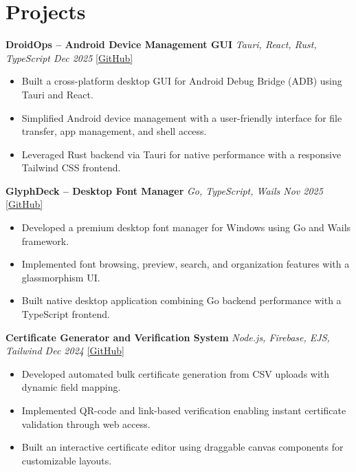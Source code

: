 \documentclass[a4paper,10pt]{article}
\begin{document}
\section*{Projects}

\textbf{DroidOps -- Android Device Management GUI} \hfill \textit{Tauri, React, Rust, TypeScript \quad Dec 2025} \quad \href{https://github.com/your-github/droidops}{[GitHub]}
\begin{itemize}
\item Built a cross-platform desktop GUI for Android Debug Bridge (ADB) using Tauri and React.
\item Simplified Android device management with a user-friendly interface for file transfer, app management, and shell access.
\item Leveraged Rust backend via Tauri for native performance with a responsive Tailwind CSS frontend.
\end{itemize}

\vspace{4pt}

\textbf{GlyphDeck -- Desktop Font Manager} \hfill \textit{Go, TypeScript, Wails \quad Nov 2025} \quad \href{https://github.com/your-github/GlyphDeck}{[GitHub]}
\begin{itemize}
\item Developed a premium desktop font manager for Windows using Go and Wails framework.
\item Implemented font browsing, preview, search, and organization features with a glassmorphism UI.
\item Built native desktop application combining Go backend performance with a TypeScript frontend.
\end{itemize}

\vspace{4pt}

\textbf{Certificate Generator and Verification System} \hfill \textit{Node.js, Firebase, EJS, Tailwind \quad Dec 2024} \quad \href{https://github.com/your-github/advanced-certificate-generator}{[GitHub]}
\begin{itemize}
\item Developed automated bulk certificate generation from CSV uploads with dynamic field mapping.
\item Implemented QR-code and link-based verification enabling instant certificate validation through web access.
\item Built an interactive certificate editor using draggable canvas components for customizable layouts.
\end{itemize}
\end{document}
